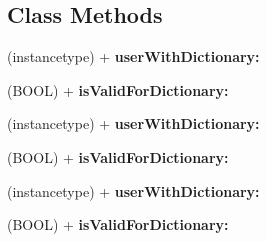 \subsection*{Class Methods}
\begin{DoxyCompactItemize}
\item 
\mbox{\label{interface_weibo_user_ab0be89366ea9beb493fb96566c69d92a}} 
(instancetype) + {\bfseries user\+With\+Dictionary\+:}
\item 
\mbox{\label{interface_weibo_user_aaa150779e34ed32c3f3d43b4454ad2b0}} 
(B\+O\+OL) + {\bfseries is\+Valid\+For\+Dictionary\+:}
\item 
\mbox{\label{interface_weibo_user_ab0be89366ea9beb493fb96566c69d92a}} 
(instancetype) + {\bfseries user\+With\+Dictionary\+:}
\item 
\mbox{\label{interface_weibo_user_aaa150779e34ed32c3f3d43b4454ad2b0}} 
(B\+O\+OL) + {\bfseries is\+Valid\+For\+Dictionary\+:}
\item 
\mbox{\label{interface_weibo_user_ab0be89366ea9beb493fb96566c69d92a}} 
(instancetype) + {\bfseries user\+With\+Dictionary\+:}
\item 
\mbox{\label{interface_weibo_user_aaa150779e34ed32c3f3d43b4454ad2b0}} 
(B\+O\+OL) + {\bfseries is\+Valid\+For\+Dictionary\+:}
\end{DoxyCompactItemize}
